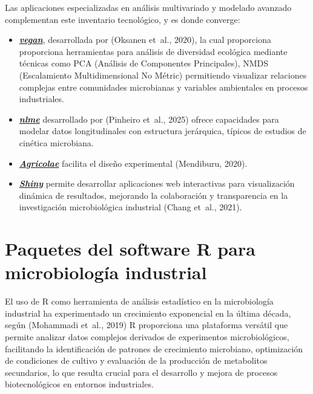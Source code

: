 \documentclass[
  spanish,
  letterpaper,
  DIV=11,
  numbers=noendperiod]{scrreprt}
\begin{document}
Las aplicaciones especializadas en análisis multivariado y modelado
avanzado complementan este inventario tecnológico, y es donde converge:

\begin{itemize}
\item
  \href{https://cran.r-project.org/web/packages/vegan/index.html}{\textbf{\emph{vegan}}},
  desarrollada por (Oksanen et~al., 2020), la cual proporciona
  proporciona herramientas para análisis de diversidad ecológica
  mediante técnicas como PCA (Análisis de Componentes Principales), NMDS
  (Escalamiento Multidimensional No Métric) permitiendo visualizar
  relaciones complejas entre comunidades microbianas y variables
  ambientales en procesos industriales.
\item
  \href{https://fhernanb.github.io/libro_modelos_mixtos/pac-nlme.html}{\textbf{\emph{nlme}}}
  desarrollado por (Pinheiro et~al., 2025) ofrece capacidades para
  modelar datos longitudinales con estructura jerárquica, típicos de
  estudios de cinética microbiana.
\item
  \href{https://cran.r-project.org/web/packages/agricolae/index.html}{\textbf{\emph{Agricolae}}}
  facilita el diseño experimental (Mendiburu, 2020).
\item
  \href{https://shiny.posit.co/r/getstarted/shiny-basics/lesson1/}{\textbf{\emph{Shiny}}}
  permite desarrollar aplicaciones web interactivas para visualización
  dinámica de resultados, mejorando la colaboración y transparencia en
  la investigación microbiológica industrial (Chang et~al., 2021).
\end{itemize}

\section{Paquetes del software R para microbiología
industrial}\label{paquetes-del-software-r-para-microbiologuxeda-industrial}

El uso de R como herramienta de análisis estadístico en la microbiología
industrial ha experimentado un crecimiento exponencial en la última
década, según (Mohammadi et~al., 2019) R proporciona una plataforma
versátil que permite analizar datos complejos derivados de experimentos
microbiológicos, facilitando la identificación de patrones de
crecimiento microbiano, optimización de condiciones de cultivo y
evaluación de la producción de metabolitos secundarios, lo que resulta
crucial para el desarrollo y mejora de procesos biotecnológicos en
entornos industriales.
\end{document}
